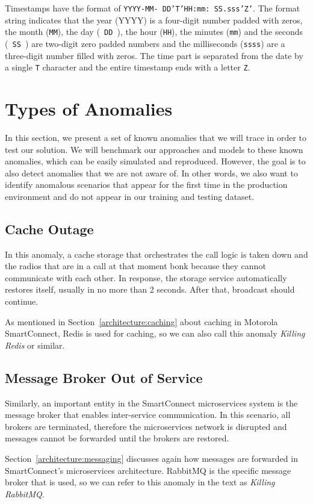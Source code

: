 Timestamps have the format of \texttt{YYYY-MM- DD'T'HH:mm: SS.sss'Z'}. The format string indicates that the year (YYYY) is a four-digit number padded with zeros, the month (\texttt{MM}), the day (\texttt{ DD }), the hour (\texttt{HH}), the minutes (\texttt{mm}) and the seconds (\texttt{ SS }) are two-digit zero padded numbers and the milliseconds (\texttt{ssss}) are a three-digit number filled with zeros. The time part is separated from the date by a single \texttt{T} character and the entire timestamp ends with a letter \texttt{Z}.

\section{Types of Anomalies}
\label{anomaly_types}
In this section, we present a set of known anomalies that we will trace in order to test our solution.
We will benchmark our approaches and models to these known anomalies, which can be easily simulated and reproduced. 
However, the goal is to also detect anomalies that we are not aware of.
In other words, we also want to identify anomalous scenarios that appear for the first time in the production environment and do not appear in our training and testing dataset.

\subsection{Cache Outage}
In this anomaly, a cache storage that orchestrates the call logic is taken down and the radios that are in a call at that moment bonk because they cannot communicate with each other.
In response, the storage service automatically restores itself, usually in no more than 2 seconds. After that, broadcast should continue.

As mentioned in Section~\ref{architecture:caching} about caching in Motorola SmartConnect, Redis is used for caching, so we can also call this anomaly \textit{ Killing Redis } or similar.

\subsection{Message Broker Out of Service}
Similarly, an important entity in the SmartConnect microservices system is the message broker that enables inter-service communication. In this scenario, all brokers are terminated, therefore the microservices network is disrupted and messages cannot be forwarded until the brokers are restored.

Section~\ref{architecture:messaging} discusses again how messages are forwarded in SmartConnect's microservices architecture. RabbitMQ is the specific message broker that is used, so we can refer to this anomaly in the text as \textit{Killing RabbitMQ}.


